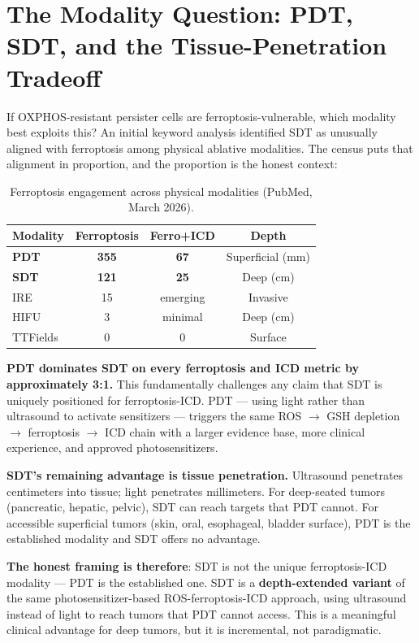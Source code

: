 \documentclass[11pt,twoside,openright]{report}
\begin{document}
\section{The Modality Question: PDT, SDT, and the Tissue-Penetration Tradeoff}

If OXPHOS-resistant persister cells are ferroptosis-vulnerable, which modality best exploits this? An initial keyword analysis identified SDT as unusually aligned with ferroptosis among physical ablative modalities. The census puts that alignment in proportion, and the proportion is the honest context:

\begin{table}[tbp]
\caption{Ferroptosis engagement across physical modalities (PubMed, March 2026).}
\label{tab:mod}
\booktablesize\begin{tabular}{lccc}
\toprule
\textbf{Modality} & \textbf{Ferroptosis} & \textbf{Ferro+ICD} & \textbf{Depth} \\
\midrule
\textbf{PDT} & \textbf{355} & \textbf{67} & Superficial (mm) \\
\textbf{SDT} & \textbf{121} & \textbf{25} & Deep (cm) \\
IRE & 15 & emerging & Invasive \\
HIFU & 3 & minimal & Deep (cm) \\
TTFields & 0 & 0 & Surface \\
\bottomrule
\end{tabular}
\end{table}
\textbf{PDT dominates SDT on every ferroptosis and ICD metric by approximately 3:1.} This fundamentally challenges any claim that SDT is uniquely positioned for ferroptosis-ICD. PDT --- using light rather than ultrasound to activate sensitizers --- triggers the same ROS $\rightarrow$ GSH depletion $\rightarrow$ ferroptosis $\rightarrow$ ICD chain with a larger evidence base, more clinical experience, and approved photosensitizers.

\textbf{SDT's remaining advantage is tissue penetration.} Ultrasound penetrates centimeters into tissue; light penetrates millimeters. For deep-seated tumors (pancreatic, hepatic, pelvic), SDT can reach targets that PDT cannot. For accessible superficial tumors (skin, oral, esophageal, bladder surface), PDT is the established modality and SDT offers no advantage.

\textbf{The honest framing is therefore}: SDT is not the unique ferroptosis-ICD modality --- PDT is the established one. SDT is a \textbf{depth-extended variant} of the same photosensitizer-based ROS-ferroptosis-ICD approach, using ultrasound instead of light to reach tumors that PDT cannot access. This is a meaningful clinical advantage for deep tumors, but it is incremental, not paradigmatic.
\end{document}
